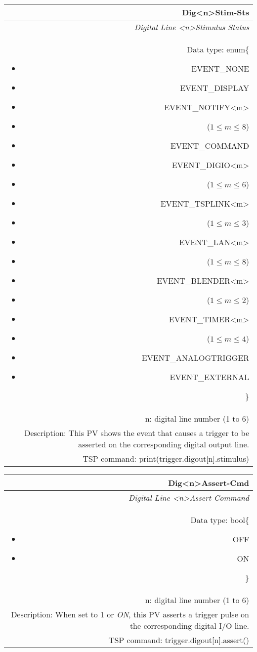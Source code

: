 \documentclass[openany]{article}
\begin{document}
		\begin{tabular}{N}
			\hline
			\bfseries Dig{\textless n\textgreater}Stim-Sts\label{pv:digstim-sts} \\ \hline
			\emph{Digital Line \textless n\textgreater Stimulus Status} \\
			Data type: enum\{\begin{itemize}[noitemsep]
				\small
				\item[] EVENT\_NONE
				\item[] EVENT\_DISPLAY
				\item[] EVENT\_NOTIFY\textless m\textgreater
				\item[] ($1\leq m\leq 8$)
				\item[] EVENT\_COMMAND
				\item[] EVENT\_DIGIO\textless m\textgreater
				\item[] ($1\leq m\leq 6$)
				\item[] EVENT\_TSPLINK\textless m\textgreater
				\item[] ($1\leq m\leq 3$)
				\item[] EVENT\_LAN\textless m\textgreater
				\item[] ($1\leq m\leq 8$)
				\item[] EVENT\_BLENDER\textless m\textgreater 
				\item[] ($1\leq m\leq 2$)
				\item[] EVENT\_TIMER\textless m\textgreater
				\item[] ($1\leq m\leq 4$)
				\item[] EVENT\_ANALOGTRIGGER
				\item[] EVENT\_EXTERNAL
			\end{itemize}\} \\
			n: digital line number (1 to 6) \\
			Description: This PV shows the event that causes a trigger to be asserted on the corresponding digital output line. \\
			TSP command: print(trigger.digout[n].stimulus)
		\end{tabular}

		\begin{tabular}{N}
			\hline
			\bfseries Dig{\textless n\textgreater}Assert-Cmd\label{pv:digassert-cmd} \\ \hline
			\emph{Digital Line \textless n\textgreater Assert Command} \\
			Data type: bool\{\begin{itemize}[noitemsep]
				\small
				\item[] OFF
				\item[] ON
			\end{itemize}\} \\
			n: digital line number (1 to 6) \\
			Description: When set to 1 or \emph{ON}, this PV asserts a trigger pulse on the corresponding digital I/O line. \\
			TSP command: trigger.digout[n].assert()
		\end{tabular}
\end{document}
